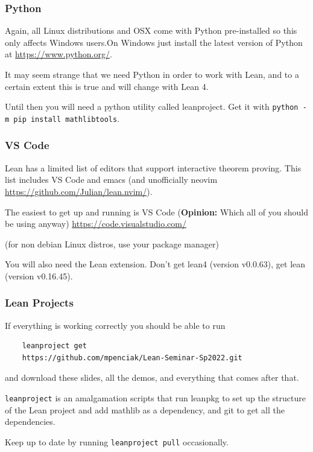 \documentclass{beamer}
\begin{document}
\begin{frame}[fragile]
    \frametitle{Python}

    Again, all Linux distributions and OSX come with Python pre-installed so this only affects Windows users.On Windows just install the latest version of Python at \url{https://www.python.org/}.
    \vspace{10pt}

    It may seem strange that we need Python in order to work with Lean, and to a certain extent this is true and will change with Lean 4.
    \vspace{10pt}
    
    Until then you will need a python utility called leanproject. Get it with \verb!python -m pip install mathlibtools!. 


\end{frame}

\begin{frame}
    \frametitle{VS Code}

    Lean has a limited list of editors that support interactive theorem proving. This list includes VS Code and emacs (and unofficially neovim \url{https://github.com/Julian/lean.nvim/}).
    \vspace{10pt}
    
    The easiest to get up and running is VS Code ({\bf Opinion:} Which all of you should be using anyway) \url{https://code.visualstudio.com/}

    (for non debian Linux distros, use your package manager)
    \vspace{10pt} 

    You will also need the Lean extension. Don't get lean4 (version v0.0.63), get lean (version v0.16.45). 

\end{frame}

\begin{frame}[fragile]
    \frametitle{Lean Projects}

    If everything is working correctly you should be able to run 
    \begin{verbatim}
    leanproject get
    https://github.com/mpenciak/Lean-Seminar-Sp2022.git
    \end{verbatim}
    and download these slides, all the demos, and everything that comes after that.
    \vspace{10pt}

    \verb!leanproject! is an amalgamation scripts that run leanpkg to set up the structure of the Lean project and add mathlib as a dependency, and git to get all the dependencies. 
    \vspace{10pt}

    Keep up to date by running \verb!leanproject pull! occasionally. 
\end{frame}
\end{document}
